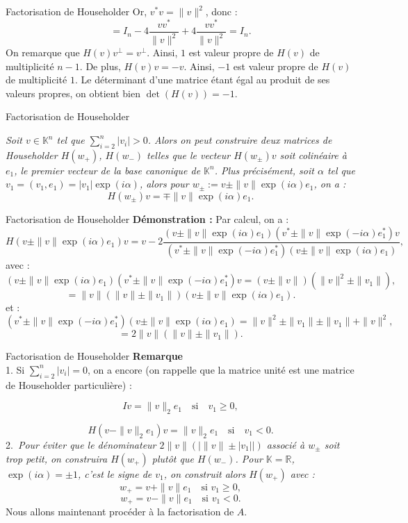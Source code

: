 \documentclass[french, 10pt]{beamer}
\theoremstyle{definition}
\begin{document}
\begin{frame}{Factorisation de Householder}
	Or, $v^* v = \|v\|^2$, donc :
	\[
	= I_n - 4 \frac{v v^*}{\|v\|^2} + 4 \frac{v v^*}{\|v\|^2} = I_n.
	\]
	On remarque que $H(v) v^\perp = v^\perp$. Ainsi, $1$ est valeur propre de $H(v)$ de multiplicité $n - 1$. De plus, $H(v) v = -v$. Ainsi, $-1$ est valeur propre de $H(v)$ de multiplicité $1$. Le déterminant d’une matrice étant égal au produit de ses valeurs propres, on obtient bien $\det(H(v)) = -1$.
	
	
\end{frame}
\begin{frame}{Factorisation de Householder}
	\begin{theorem}
		\textit{Soit $v \in \mathbb{K}^n$ tel que $\sum\limits_{i=2}^{n} |v_i| > 0$. Alors on peut construire deux matrices de Householder $H(w_+)$, $H(w_-)$ telles que le vecteur $H(w_\pm)v$ soit colinéaire à $e_1$, le premier vecteur de la base canonique de $\mathbb{K}^n$. Plus précisément, soit $\alpha$ tel que $v_1 = (v_1, e_1) = |v_1| \exp(i\alpha)$, alors pour $w_\pm := v \pm \|v\| \exp(i\alpha) e_1$, on a :}
		\[
		H(w_\pm)v = \mp \|v\| \exp(i\alpha) e_1.
		\]
	\end{theorem}
\end{frame}
\begin{frame}{Factorisation de Householder}
	\textbf{Démonstration :} Par calcul, on a :
	\[
	H(v \pm \|v\| \exp(i\alpha) e_1)v = v - 2 \frac{(v \pm \|v\| \exp(i\alpha) e_1)(v^* \pm \|v\| \exp(-i\alpha) e_1^*)v}{(v^* \pm \|v\| \exp(-i\alpha) e_1^*)(v \pm \|v\| \exp(i\alpha) e_1)},
	\]
	avec :
	\[
	(v \pm \|v\| \exp(i\alpha) e_1)(v^* \pm \|v\| \exp(-i\alpha) e_1^*)v = (v \pm \|v\|)(\|v\|^2 \pm \|v_1\|),
	\]
	\[
	= \|v\|(\|v\| \pm \|v_1\|)(v \pm \|v\| \exp(i\alpha) e_1).
	\]
	et :
	\[
	(v^* \pm \|v\| \exp(-i\alpha) e_1^*)(v \pm \|v\| \exp(i\alpha) e_1) = \|v\|^2 \pm \|v_1\| \pm \|v_1\| + \|v\|^2,
	\]
	\[
	= 2\|v\|(\|v\| \pm \|v_1\|).
	\]
\end{frame}

\begin{frame}{Factorisation de Householder}
	\textbf{Remarque}\\ 
	1. Si $\sum_{i=2}^{n} |v_i| = 0$, on a encore (on rappelle que la matrice unit\'e est une matrice de Householder particuli\`ere) :
	
	\[
	Iv = \|v\|_2 e_1 \quad \text{si} \quad v_1 \geqslant 0,
	\]
	
	\[
	H(v - \|v\|_2 e_1)v = \|v\|_2 e_1 \quad \text{si} \quad v_1 < 0.
	\]
	2.\ \textit{Pour éviter que le dénominateur $2\|v\|(|\|v\| \pm |v_1||)$ associé à $w_\pm$ soit trop petit, on construira $H(w_+)$ plutôt que $H(w_-)$. Pour $\mathbb{K} = \mathbb{R}$, $\exp(i\alpha) = \pm1$, c’est le signe de $v_1$, on construit alors $H(w_+)$ avec :}
	\[
	w_+ = v + \|v\| e_1 \quad \text{si } v_1 \geq 0,
	\]
	\[
	w_+ = v - \|v\| e_1 \quad \text{si } v_1 < 0.
	\]
	Nous allons maintenant procéder à la factorisation de $A$.
	
\end{frame}
\end{document}
